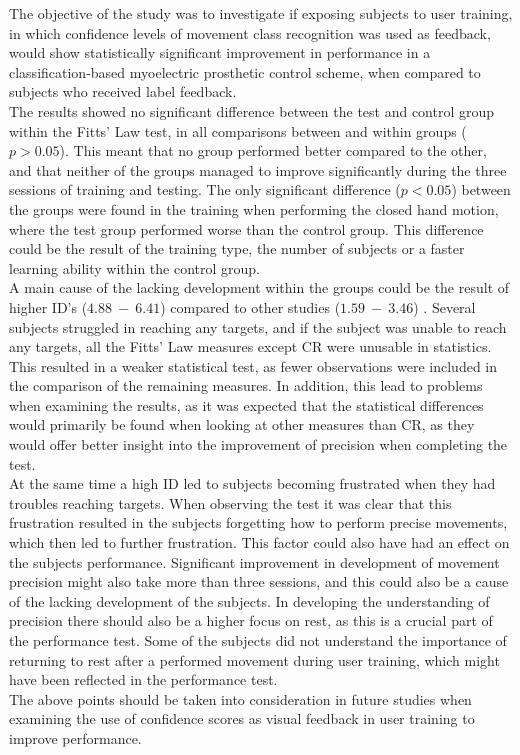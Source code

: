 The objective of the study was to investigate if exposing subjects to user training, in which confidence levels of movement class recognition was used as feedback, would show statistically significant improvement in performance in a classification-based myoelectric prosthetic control scheme, when compared to subjects who received label feedback. \\
The results showed no significant difference between the test and control group within the Fitts' Law test, in all comparisons between and within groups ($p > 0.05$). This meant that no group performed better compared to the other, and that neither of the groups managed to improve significantly during the three sessions of training and testing. The only significant difference ($p < 0.05$) between the groups were found in the training when performing the closed hand motion, where the test group performed worse than the control group. This difference could be the result of the training type, the number of subjects or a faster learning ability within the control group.\\
A main cause of the lacking development within the groups could be the result of higher ID's ($4.88~-~6.41$) compared to other studies ($1.59~-~3.46$) \cite{Scheme2013, Scheme2013a}. Several subjects struggled in reaching any targets, and if the subject was unable to reach any targets, all the Fitts' Law measures except CR were unusable in statistics. This resulted in a weaker statistical test, as fewer observations were included in the comparison of the remaining measures. In addition, this lead to problems when examining the results, as it was expected that the statistical differences would primarily be found when looking at other measures than CR, as they would offer better insight into the improvement of precision when completing the test.  \\
At the same time a high ID led to subjects becoming frustrated when they had troubles reaching targets. When observing the test it was clear that this frustration resulted in the subjects forgetting how to perform precise movements, which then led to further frustration. This factor could also have had an effect on the subjects performance. Significant improvement in development of movement precision might also take more than three sessions, and this could also be a cause of the lacking development of the subjects. In developing the understanding of precision there should also be a higher focus on rest, as this is a crucial part of the performance test. Some of the subjects did not understand the importance of returning to rest after a performed movement during user training, which might have been reflected in the performance test.\\
The above points should be taken into consideration in future studies when examining the use of confidence scores as visual feedback in user training to improve performance.


